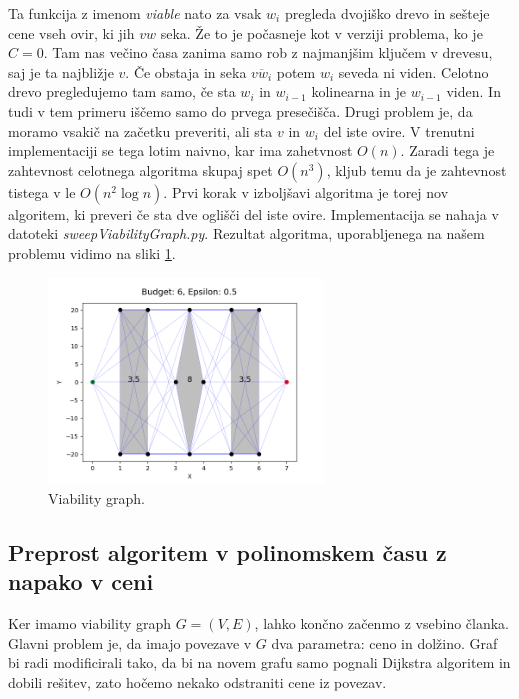 \documentclass{article}
\begin{document}
Ta funkcija z imenom \emph{viable} nato za vsak $w_i$ pregleda dvojiško drevo in sešteje cene vseh ovir, ki jih $vw$ seka. Že to je počasneje kot v verziji problema, ko je $C = 0$. Tam nas večino časa zanima samo rob z najmanjšim ključem v drevesu, saj je ta najbližje $v$. Če obstaja in seka $\overline{vw_i}$ potem $w_i$ seveda ni viden. Celotno drevo pregledujemo tam samo, če sta $w_i$ in $w_{i-1}$ kolinearna in je $w_{i-1}$ viden. In tudi v tem primeru iščemo samo do prvega presečišča. Drugi problem je, da moramo vsakič na začetku preveriti, ali sta $v$ in $w_i$ del iste ovire. V trenutni implementaciji se tega lotim naivno, kar ima zahetvnost $O(n)$. Zaradi tega je zahtevnost celotnega algoritma skupaj spet $O(n^3)$, kljub temu da je zahtevnost tistega v \cite{BCKO} le $O(n^2 \log n)$. Prvi korak v izboljšavi algoritma je torej nov algoritem, ki preveri če sta dve oglišči del iste ovire. Implementacija se nahaja v datoteki \emph{sweepViabilityGraph.py}. Rezultat algoritma, uporabljenega na našem problemu vidimo na sliki \ref{fig:errG1}.

\begin{figure}[h]
    \centering
    \includegraphics[width=0.65\textwidth]{errGraph1.png}
    \caption{Viability graph.}
    \label{fig:errG1}
\end{figure}

 
\subsection*{Preprost algoritem v polinomskem času z napako v ceni}

Ker imamo viability graph $G = (V,E)$, lahko končno začenmo z vsebino članka. Glavni problem je, da imajo povezave v $G$ dva parametra: ceno in dolžino.
Graf bi radi modificirali tako, da bi na novem grafu samo pognali Dijkstra algoritem in dobili rešitev, zato hočemo nekako odstraniti cene iz povezav. 
\end{document}
